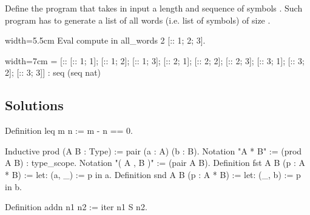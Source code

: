 \begin{Exercise}[label=ex:allwords,difficulty=2,title={All words of size n}]
Define the  program that takes in input a
length  and sequence of symbols .
Such program has to generate a list of all words (i.e. list
of symbols) of size .

\begin{coq}{}{width=5.5cm}
Eval compute in
  all_words 2 [:: 1; 2; 3].
\end{coq}
\begin{coqout}{}{width=7cm}
 = [:: [:: 1; 1]; [:: 1; 2]; [:: 1; 3];
       [:: 2; 1]; [:: 2; 2]; [:: 2; 3];
       [:: 3; 1]; [:: 3; 2]; [:: 3; 3]]
 : seq (seq nat)
\end{coqout}
\end{Exercise}

\subsection{Solutions}

\begin{Answer}[ref=ex:leq]

\begin{coq}{}{}
Definition leq m n := m - n == 0.
\end{coq}

\end{Answer}

\begin{Answer}[ref=ex:pair]

\begin{coq}{}{}
Inductive prod (A B : Type) := pair (a : A) (b : B).
Notation "A * B" := (prod A B) : type_scope.
Notation "( A , B )" := (pair A B).
Definition fst A B (p : A * B) := let: (a, _) := p in a.
Definition snd A B (p : A * B) := let: (_, b) := p in b.
\end{coq}

\end{Answer}

\begin{Answer}[ref=ex:iteradd]

\begin{coq}{}{}
Definition addn n1 n2 := iter n1 S n2.
\end{coq}

\end{Answer}

